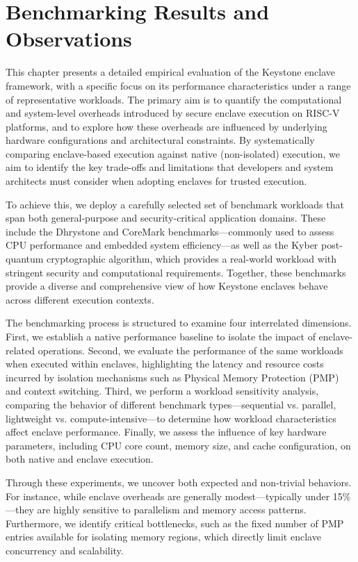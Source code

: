\chapter{Benchmarking Results and Observations}
\label{chap:benchmarking}

This chapter presents a detailed empirical evaluation of the Keystone enclave framework, with a specific focus on its performance characteristics under a range of representative workloads. The primary aim is to quantify the computational and system-level overheads introduced by secure enclave execution on RISC-V platforms, and to explore how these overheads are influenced by underlying hardware configurations and architectural constraints. By systematically comparing enclave-based execution against native (non-isolated) execution, we aim to identify the key trade-offs and limitations that developers and system architects must consider when adopting enclaves for trusted execution.

To achieve this, we deploy a carefully selected set of benchmark workloads that span both general-purpose and security-critical application domains. These include the Dhrystone and CoreMark benchmarks—commonly used to assess CPU performance and embedded system efficiency—as well as the Kyber post-quantum cryptographic algorithm, which provides a real-world workload with stringent security and computational requirements. Together, these benchmarks provide a diverse and comprehensive view of how Keystone enclaves behave across different execution contexts.

The benchmarking process is structured to examine four interrelated dimensions. First, we establish a native performance baseline to isolate the impact of enclave-related operations. Second, we evaluate the performance of the same workloads when executed within enclaves, highlighting the latency and resource costs incurred by isolation mechanisms such as Physical Memory Protection (PMP) and context switching. Third, we perform a workload sensitivity analysis, comparing the behavior of different benchmark types—sequential vs. parallel, lightweight vs. compute-intensive—to determine how workload characteristics affect enclave performance. Finally, we assess the influence of key hardware parameters, including CPU core count, memory size, and cache configuration, on both native and enclave execution.

Through these experiments, we uncover both expected and non-trivial behaviors. For instance, while enclave overheads are generally modest—typically under 15\%—they are highly sensitive to parallelism and memory access patterns. Furthermore, we identify critical bottlenecks, such as the fixed number of PMP entries available for isolating memory regions, which directly limit enclave concurrency and scalability.

